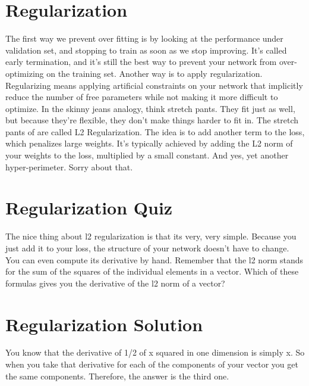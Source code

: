 \documentclass{article}
\begin{document}
\section{Regularization}
The first way we prevent over fitting
is by looking at the performance under
validation set, and stopping to
train as soon as we stop improving.
It's called early termination, and
it's still the best way to prevent your
network from over-optimizing
on the training set.
Another way is to apply regularization.
Regularizing means applying artificial
constraints on your network
that implicitly reduce
the number of free parameters
while not making it more
difficult to optimize.
In the skinny jeans analogy,
think stretch pants.
They fit just as well, but
because they're flexible,
they don't make things harder to fit in.
The stretch pants of
are called L2 Regularization.
The idea is to add another term to
the loss, which penalizes large weights.
It's typically achieved by adding the L2
norm of your weights to the loss,
multiplied by a small constant.
And yes, yet another hyper-perimeter.
Sorry about that.
\section{Regularization Quiz}
The nice thing about l2 regularization
is that its very, very simple.
Because you just add it to your loss,
the structure of your network
doesn't have to change.
You can even compute
its derivative by hand.
Remember that the l2 norm stands for
the sum of the squares of
the individual elements in a vector.
Which of these formulas gives you the
derivative of the l2 norm of a vector?
\section{Regularization Solution}
You know that the derivative of 1/2 of
x squared in one dimension is simply x.
So when you take that derivative for
each of the components of your
vector you get the same components.
Therefore, the answer is the third one.
\end{document}
